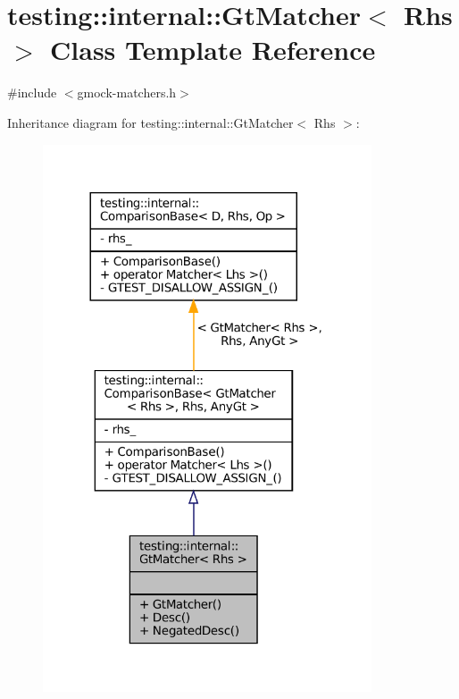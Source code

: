 \hypertarget{classtesting_1_1internal_1_1GtMatcher}{}\section{testing\+:\+:internal\+:\+:Gt\+Matcher$<$ Rhs $>$ Class Template Reference}
\label{classtesting_1_1internal_1_1GtMatcher}


{\ttfamily \#include $<$gmock-\/matchers.\+h$>$}



Inheritance diagram for testing\+:\+:internal\+:\+:Gt\+Matcher$<$ Rhs $>$\+:
\nopagebreak
\begin{figure}[H]
\begin{center}
\leavevmode
\includegraphics[width=276pt]{classtesting_1_1internal_1_1GtMatcher__inherit__graph}
\end{center}
\end{figure}


